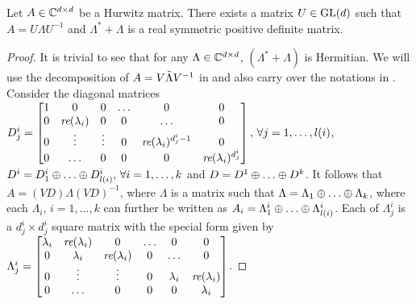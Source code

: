 \begin{lemma}\label{lm:simtran}
Let $A\in \mathbb{C}^{d \times d}$ be a Hurwitz matrix. There exists a matrix $U\in \mathrm{GL}(d)$ such that $A=U\Lambda U^{-1}$ and $\Lambda^*+\Lambda$ is a real symmetric positive definite matrix.
\end{lemma}
\begin{proof}
It is trivial to see that for any $\Lambda\in \mathbb{C}^{d \times d}$, $\left(\Lambda^*+\Lambda\right)$ is Hermitian. We will use the decomposition of $A=V \tilde{\Lambda} V^{-1}$ in  and also carry over the notations in . Consider the diagonal matrices $D^i_j=\begin{bmatrix} 1  &0 &0 &\ldots &0 &0\\ 0 &\emph{re}(\lambda_i) &0 &0 &\ldots &0 \\ 0 &\vdots &\vdots &0 &\emph{re}(\lambda_i)^{d^i_j-1} &0 \\ 0 &\ldots &0 &0 &0 &\emph{re}(\lambda_i)^{d^i_j} \end{bmatrix},\,\forall j=1,\ldots,l(i)$, $D^i=D^i_1 \oplus\ldots\oplus D^i_{l(i)},\,\forall i=1,\ldots,k$ and $D=D^1 \oplus\ldots\oplus D^k$.
It follows that $A=(VD) \Lambda (VD)^{-1}$, where $\Lambda$ is a matrix such that
$\Lambda=\Lambda_1 \oplus \ldots \oplus \Lambda_k$, where each $\Lambda_i,\,i=1,\ldots,k$ can further be written as
$A_i=\Lambda^i_{1} \oplus \ldots \oplus \Lambda^i_{{l(i)}}$. Each of $\Lambda^i_{j}$ is a $d^i_j\times d^i_j$ square matrix with the special form given by
$\Lambda^i_{j}=\begin{bmatrix} \lambda_i &\emph{re}(\lambda_i) &0 &\ldots &0 &0\\ 0 &\lambda_i &\emph{re}(\lambda_i) &0 &\ldots &0 \\ 0 &\vdots &\vdots &0 &\lambda_i &\emph{re}(\lambda_i) \\ 0 &\ldots &0 &0 &0 &\lambda_i \end{bmatrix}$.


\end{proof}
